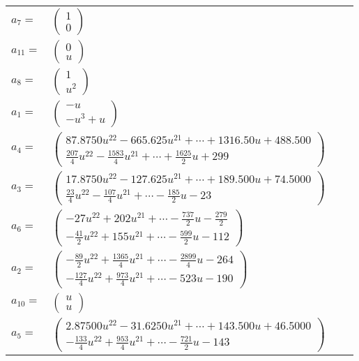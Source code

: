 \documentclass[1p]{elsarticle_modified}
\theoremstyle{definition}
\begin{document}
\begin{tabular}{m{7pt} m{180pt} m{7pt} m{180pt} }
\flushright $a_{7}=$&$\begin{pmatrix}1\\0\end{pmatrix}$ \\
\flushright $a_{11}=$&$\begin{pmatrix}0\\u\end{pmatrix}$ \\
\flushright $a_{8}=$&$\begin{pmatrix}1\\u^2\end{pmatrix}$ \\
\flushright $a_{1}=$&$\begin{pmatrix}- u\\- u^3+u\end{pmatrix}$ \\
\flushright $a_{4}=$&$\begin{pmatrix}87.8750 u^{22}-665.625 u^{21}+\cdots+1316.50 u+488.500\\\frac{207}{4} u^{22}-\frac{1583}{4} u^{21}+\cdots+\frac{1625}{2} u+299\end{pmatrix}$ \\
\flushright $a_{3}=$&$\begin{pmatrix}17.8750 u^{22}-127.625 u^{21}+\cdots+189.500 u+74.5000\\\frac{23}{4} u^{22}-\frac{107}{4} u^{21}+\cdots-\frac{185}{2} u-23\end{pmatrix}$ \\
\flushright $a_{6}=$&$\begin{pmatrix}-27 u^{22}+202 u^{21}+\cdots-\frac{737}{2} u-\frac{279}{2}\\-\frac{41}{2} u^{22}+155 u^{21}+\cdots-\frac{599}{2} u-112\end{pmatrix}$ \\
\flushright $a_{2}=$&$\begin{pmatrix}-\frac{89}{2} u^{22}+\frac{1365}{4} u^{21}+\cdots-\frac{2899}{4} u-264\\-\frac{127}{4} u^{22}+\frac{973}{4} u^{21}+\cdots-523 u-190\end{pmatrix}$ \\
\flushright $a_{10}=$&$\begin{pmatrix}u\\u\end{pmatrix}$ \\
\flushright $a_{5}=$&$\begin{pmatrix}2.87500 u^{22}-31.6250 u^{21}+\cdots+143.500 u+46.5000\\-\frac{133}{4} u^{22}+\frac{953}{4} u^{21}+\cdots-\frac{721}{2} u-143\end{pmatrix}$ \\

\end{tabular}
\end{document}
